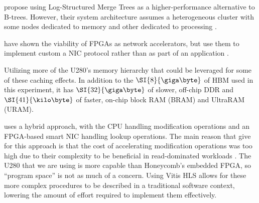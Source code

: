 

\citeauthor{dlsm} propose using Log-Structured Merge Trees as a
higher-performance alternative to B-trees. However, their system architecture
assumes a heterogeneous cluster with some nodes dedicated to memory and other
dedicated to processing \autocite{dlsm}.



\citeauthor{star} have shown the viability of FPGAs as network accelerators, but
use them to implement custom a NIC protocol rather than as part of an
application \autocite{star}.

Utilizing more of the U280's memory hierarchy that could be leveraged for some
of these caching effects. In addition to the $\SI{8}{\giga\byte}$ of HBM used in
this experiment, it has $\SI{32}{\giga\byte}$ of slower, off-chip DDR and
$\SI{41}{\kilo\byte}$ of faster, on-chip block RAM (BRAM) and UltraRAM (URAM).

 uses a hybrid approach, with the CPU handling modification
operations and an FPGA-based smart NIC handling lookup operations. The main
reason that \citeauthor{honeycomb} give for this approach is that the cost of
accelerating modification operations was too high due to their complexity to be
beneficial in read-dominated workloads \autocite{honeycomb}. The U280 that we
are using is more capable than Honeycomb's embedded FPGA, so ``program space''
is not as much of a concern. Using Vitis HLS allows for these more complex
procedures to be described in a traditional software context, lowering the
amount of effort required to implement them effectively.
